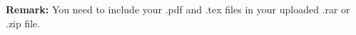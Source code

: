 \documentclass[12pt,a4paper,UTF8]{article}
\theoremstyle{definition}
\begin{document}
\begin{enumerate}
\end{enumerate}

\vspace{20pt}

\textbf{Remark:} You need to include your .pdf and .tex files in your uploaded .rar or .zip file.

\end{document}
